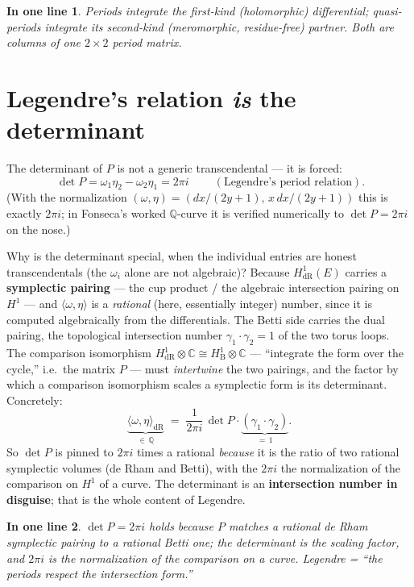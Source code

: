 \documentclass[11pt]{article}
\newcommand{\QQ}{\mathbb{Q}}
\newcommand{\CC}{\mathbb{C}}
\newcommand{\HdR}{H^1_{\mathrm{dR}}}
\newcommand{\HB}{H^1_{\mathrm{B}}}
\newtheorem*{slogan}{In one line}
\begin{document}
\begin{slogan}
Periods integrate the first-kind (holomorphic) differential; quasi-periods
integrate its second-kind (meromorphic, residue-free) partner. Both are
columns of one $2\times 2$ period matrix.
\end{slogan}

\section{Legendre's relation \emph{is} the determinant}

The determinant of $P$ is not a generic transcendental --- it is forced:
\[
  \boxed{\ \det P
  = \omega_1\eta_2 - \omega_2\eta_1
  = 2\pi i\ }\qquad(\text{Legendre's period relation}).
\]
(With the normalization $(\omega,\eta) = (dx/(2y+1),\, x\,dx/(2y+1))$ this
is exactly $2\pi i$; in Fonseca's worked $\QQ$-curve it is verified
numerically to $\det P = 2\pi i$ on the nose.)

Why is the determinant special, when the individual entries are
honest transcendentals (the $\omega_i$ alone are not algebraic)? Because
$\HdR(E)$ carries a \textbf{symplectic pairing} --- the cup product / the
algebraic intersection pairing on $H^1$ --- and $\langle \omega, \eta
\rangle$ is a \emph{rational} (here, essentially integer) number, since it
is computed algebraically from the differentials. The Betti side carries
the dual pairing, the topological intersection number $\gamma_1 \cdot
\gamma_2 = 1$ of the two torus loops. The comparison isomorphism
$\HdR \otimes \CC \cong \HB \otimes \CC$ --- ``integrate the form over the
cycle,'' i.e.\ the matrix $P$ --- must \emph{intertwine} the two pairings,
and the factor by which a comparison isomorphism scales a symplectic form
is its determinant. Concretely:
\[
  \underbrace{\langle \omega, \eta\rangle_{\mathrm{dR}}}_{\in\,\QQ}
  \;=\; \frac{1}{2\pi i}\,
  \det P \cdot \underbrace{(\gamma_1\cdot\gamma_2)}_{=\,1}.
\]
So $\det P$ is pinned to $2\pi i$ times a rational \emph{because} it is the
ratio of two rational symplectic volumes (de Rham and Betti), with the
$2\pi i$ the normalization of the comparison on $H^1$ of a curve. The
determinant is an \textbf{intersection number in disguise}; that is the
whole content of Legendre.

\begin{slogan}
$\det P = 2\pi i$ holds because $P$ matches a rational de Rham symplectic
pairing to a rational Betti one; the determinant is the scaling factor,
and $2\pi i$ is the normalization of the comparison on a curve. Legendre =
``the periods respect the intersection form.''
\end{slogan}
\end{document}
